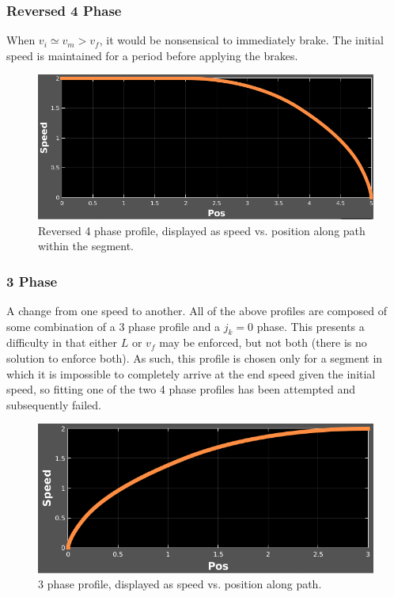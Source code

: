 \documentclass[letterpaper, 10 pt, conference]{ieeeconf}  %
\begin{document}
\subsubsection{Reversed 4 Phase} \label{sec:reversed4phase}

When $v_i \simeq v_m > v_f$, it would be nonsensical to immediately brake.
The initial speed is maintained for a period before applying the brakes.

\begin{figure}[thpb]
  \centering
  \includegraphics[width=0.7\columnwidth]{graphics/4Rphase_all_derivatives.png}
  \caption{Reversed 4 phase profile, displayed as speed vs. position along path within the segment.}
  \label{fig:4rphaseprofile}
\end{figure}

\subsubsection{3 Phase} \label{sec:3phase}

A change from one speed to another.
All of the above profiles are composed of some combination of a 3 phase profile and a $j_k = 0$ phase.
This presents a difficulty in that either $L$ or $v_f$ may be enforced, but not both (there is no solution to enforce both).
As such, this profile is chosen only for a segment in which it is impossible to completely arrive at the end speed given the initial speed, so fitting one of the two 4 phase profiles has been attempted and subsequently failed.

\begin{figure}[thpb]
  \centering
  \includegraphics[width=0.7\columnwidth]{graphics/3phase_v(s).png}
  \caption{3 phase profile, displayed as speed vs. position along path.}
  \label{fig:3phaseprofile}
\end{figure}
\end{document}
